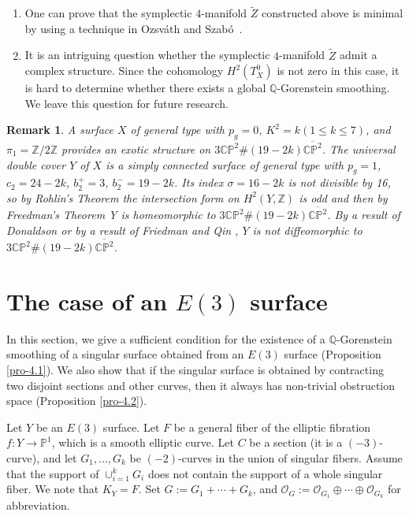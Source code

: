 \documentclass[twoside,11pt]{amsart}
\newtheorem{remark}{Remark}[section]
\begin{document}
\begin{enumerate}
\item One can prove that the symplectic $4$-manifold $\widetilde{Z}$ constructed above is
minimal by using a technique in Ozsv\'{a}th and Szab\'{o}~\cite{Ozsvath-Szabo}.

\item It is an intriguing question whether the symplectic $4$-manifold $\widetilde{Z}$ admit a complex structure.
Since the cohomology $H^2 (T^0_{X})$ is not zero in this case, it is
hard to determine whether there exists a global
$\mathbb{Q}$-Gorenstein smoothing. We leave this question for future
research.
\end{enumerate}

\begin{remark}
 A surface $X$ of general type with $p_g=0$, $K^2=k
 (1\le k\le 7)$, and $\pi_1={{\mathbb Z}}/2{{\mathbb Z}}$ provides an exotic structure
on $3{{\mathbb C}}{{\mathbb P}}^2\# (19-2k)\overline{{{\mathbb C}}{{\mathbb P}}^2}$. The universal double
cover $Y$ of $X$ is a simply connected surface of general type
with $p_g=1$, $c_2=24-2k$, $b_2^+=3$, $b_2^-=19-2k$. Its index
$\sigma=16-2k$ is not divisible by 16, so by Rohlin's Theorem
\cite{Roh} the intersection form on $H^2(Y,{{\mathbb Z}})$ is odd and then
by Freedman's Theorem \cite{Free} Y is homeomorphic to
$3{{\mathbb C}}{{\mathbb P}}^2\# (19-2k)\overline{{{\mathbb C}}{{\mathbb P}}^2}$. By a result of Donaldson
\cite{Don} or by a result of Friedman and Qin \cite{FQ}, $Y$ is
not diffeomorphic to $3{{\mathbb C}}{{\mathbb P}}^2\# (19-2k)\overline{{{\mathbb C}}{{\mathbb P}}^2}$.
\end{remark}

\section{The case of an  $E(3)$ surface}
\label{sec-4}

In this section, we give a sufficient condition for the existence
of a ${{\mathbb Q}}$-Gorenstein smoothing of a singular surface obtained
from an  $E(3)$ surface (Proposition \ref{pro-4.1}). We also show
that if the singular surface is obtained by contracting two
disjoint sections and other curves, then it always has non-trivial
obstruction space (Proposition \ref{pro-4.2}).

 Let $Y$ be an $E(3)$ surface. Let $F$
be a general fiber of the elliptic fibration $f: Y\to {{\mathbb P}}^1$,
which is a smooth elliptic curve. Let $C$ be a section (it is a
$(-3)$-curve), and let  $G_1,\ldots, G_k$ be $(-2)$-curves in the
union of singular fibers. Assume that the support of $\cup_{i=1}^k
G_i$ does not contain the support of a whole singular fiber. We
note that $K_Y=F$. Set $G:=G_1+\cdots +G_k$, and
${{\mathcal O}}_G:={{\mathcal O}}_{G_1}\oplus\cdots\oplus{{\mathcal O}}_{G_k}$ for abbreviation.
\end{document}
